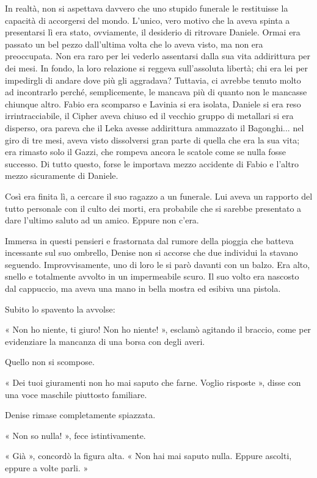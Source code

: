In realtà, non si aspettava davvero che uno stupido funerale le restituisse la capacità di accorgersi del mondo. L'unico, vero motivo che la aveva spinta a presentarsi lì era stato, ovviamente, il desiderio di ritrovare Daniele. Ormai era passato un bel pezzo dall'ultima volta che lo aveva visto, ma non era preoccupata. Non era raro per lei vederlo assentarsi dalla sua vita addirittura per dei mesi. In fondo, la loro relazione si reggeva sull'assoluta libertà; chi era lei per impedirgli di andare dove più gli aggradava? Tuttavia, ci avrebbe tenuto molto ad incontrarlo perché, semplicemente, le mancava più di quanto non le mancasse chiunque altro. Fabio era scomparso e Lavinia si era isolata, Daniele si era reso irrintracciabile, il Cipher aveva chiuso ed il vecchio gruppo di metallari si era disperso, ora pareva che il Leka avesse addirittura ammazzato il Bagonghi... nel giro di tre mesi, aveva visto dissolversi gran parte di quella che era la sua vita; era rimasto solo il Gazzi, che rompeva ancora le scatole come se nulla fosse successo. Di tutto questo, forse le importava mezzo accidente di Fabio e l'altro mezzo sicuramente di Daniele.

Così era finita lì, a cercare il suo ragazzo a un funerale. Lui aveva un rapporto del tutto personale con il culto dei morti, era probabile che si sarebbe presentato a dare l'ultimo saluto ad un amico. Eppure non c'era.

Immersa in questi pensieri e frastornata dal rumore della pioggia che batteva incessante sul suo ombrello, Denise non si accorse che due individui la stavano seguendo. Improvvisamente, uno di loro le si parò davanti con un balzo. Era alto, snello e totalmente avvolto in un impermeabile scuro. Il suo volto era nascosto dal cappuccio, ma aveva una mano in bella mostra ed esibiva una pistola.

Subito lo spavento la avvolse:

« Non ho niente, ti giuro! Non ho niente! », esclamò agitando il braccio, come per evidenziare la mancanza di una borsa con degli averi.

Quello non si scompose.

« Dei tuoi giuramenti non ho mai saputo che farne. Voglio risposte », disse con una voce maschile piuttosto familiare.

Denise rimase completamente spiazzata.

« Non so nulla! », fece istintivamente.

« Già », concordò la figura alta. « Non hai mai saputo nulla. Eppure ascolti, eppure a volte parli. »

